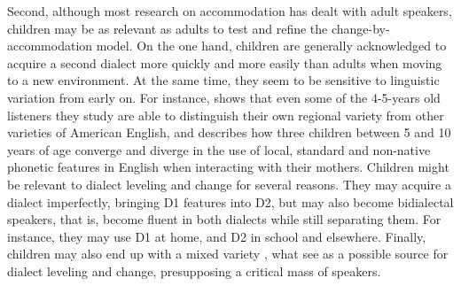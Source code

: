\documentclass[output=paper,
modfonts
]{langscibook}
\begin{document}
Second, although most research on accommodation has dealt with adult speakers, children may be as relevant as adults to test and refine the change-by-ac\-com\-mo\-dation model. On the one hand, children are generally acknowledged to acquire a second dialect more quickly and more easily than adults \citep{siegel_second_2010} when moving to a new environment. At the same time, they seem to be sensitive to linguistic variation from early on. For instance, \cite{jones_development_2017} shows that even some of the 4-5-years old listeners they study are able to distinguish their own regional variety from other varieties of American English, and \cite{khattab_phonetic_2013} describes how three children between 5 and 10 years of age converge and diverge in the use of local, standard and non-native phonetic features in English when interacting with their mothers. 
Children might be relevant to dialect leveling and change for several reasons. They may acquire a dialect imperfectly, bringing D1 features into D2, but may also become bidialectal speakers, that is, become fluent in both dialects while still separating them. For instance, they may use D1 at home, and D2 in school and elsewhere. Finally, children may also end up with a mixed variety \citep{chambers_dialect_1992,tagliamonte_howd_2007}, what \cite{klee_andean_2006} see as a possible source for dialect leveling and change, presupposing a critical mass of speakers.
% 
% 
% 
% 
% 
\end{document}
